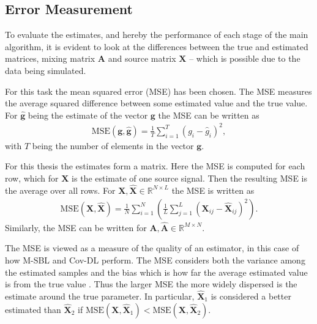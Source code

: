 \subsection{Error Measurement}\label{sec:mse}  
To evaluate the estimates, and hereby the performance of each stage of the main algorithm, it is evident to look at the differences between the true and estimated matrices, mixing matrix $\mathbf{A}$ and source matrix $\mathbf{X}$ -- which is possible due to the data being simulated. 

For this task the mean squared error (MSE) has been chosen. 
The MSE measures the average squared difference between some estimated value and the true value. 
For $\hat{\mathbf{g}}$ being the estimate of the vector $\mathbf{g}$ the MSE can be written as 
\begin{align*}
\text{MSE}(\mathbf{g},\hat{\mathbf{g}}) = \frac{1}{T} \sum_{i=1}^T (g_i - \hat{g}_i)^2, 
\end{align*}
with $T$ being the number of elements in the vector $\mathbf{g}$. 

For this thesis the estimates form a matrix. 
Here the MSE is computed for each row, which for $\mathbf{X}$ is the estimate of one source signal. 
Then the resulting MSE is the average over all rows. 
For $\mathbf{X}, \hat{\mathbf{X}} \in \mathbb{R}^{N \times L}$ the MSE is written as 
\begin{align*}
\text{MSE}(\mathbf{X},\hat{\mathbf{X}}) = \frac{1}{N} \sum_{i=1}^{N} \left( \frac{1}{L} \sum_{j=1}^L (\mathbf{X}_{ij} - \hat{\mathbf{X}}_{ij})^2\right).  
\end{align*}
Similarly, the MSE can be written for $\mathbf{A},\hat{\mathbf{A}} \in \mathbb{R}^{M \times N}$.  

The MSE is viewed as a measure of the quality of an estimator, in this case of how M-SBL and Cov-DL perform. 
The MSE considers both the variance among the estimated samples and the bias which is how far the average estimated value is from the true value \cite[p. 305]{MSE_book}.  
Thus the larger MSE the more widely dispersed is the estimate around the true parameter.
In particular, $\hat{\mathbf{X}}_1$ is considered  a better estimated than $\hat{\mathbf{X}}_2$ if $\text{MSE}(\mathbf{X},\hat{\mathbf{X}}_1)< \text{MSE}(\mathbf{X},\hat{\mathbf{X}}_2)$. 

